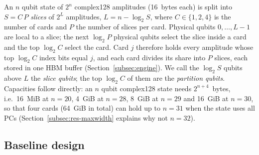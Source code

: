 \documentclass[pdflatex,sn-mathphys-num]{sn-jnl}
\theoremstyle{thmstyleone}
\theoremstyle{thmstylethree}
\begin{document}
An $n$ qubit state of $2^n$ complex128 amplitudes (16~bytes each) is split into $S = C\,P$ \emph{slices} of $2^L$
amplitudes, $L = n - \log_2 S$, where $C \in \{1,2,4\}$ is the number of cards and $P$ the number of slices per card.
Physical qubits $0,\dots,L-1$ are local to a slice; the next $\log_2 P$ physical qubits select the slice inside a card
and the top $\log_2 C$ select the card. Card $j$ therefore holds every amplitude whose top $\log_2 C$ index bits
equal $j$, and each card divides its share into $P$ slices, each stored in one HBM buffer (Section~\ref{subsec:engine}). We call the
$\log_2 S$ qubits above $L$ the \emph{slice qubits}; the top $\log_2 C$ of them are the \emph{partition qubits}. Capacities follow directly: an $n$ qubit complex128 state needs $2^{n+4}$~bytes, i.e.\ 16~MiB at
$n=20$, 4~GiB at $n=28$, 8~GiB at $n=29$ and 16~GiB at $n=30$, so that four cards (64~GiB in total) can hold
up to $n = 31$ when the state uses all PCs (Section~\ref{subsec:res-maxwidth} explains why not $n=32$).

\subsection{Baseline design}\label{subsec:baseline-design}
\end{document}
